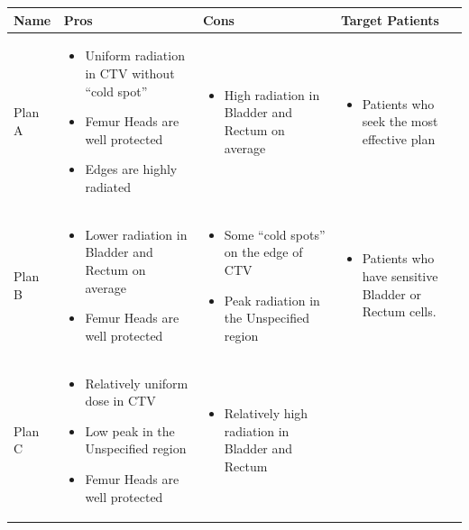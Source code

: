 \documentclass{report}
\begin{document}
\begin{table}[H]
    \centering
     \setlength{\leftmargini}{0.4cm}
    \begin{tabular}{| m{2cm} | m{4cm} | m{4cm} | m{4cm} |}
        \hline
        Name & Pros & Cons & Target Patients \\
        \hline
        Plan A & 
        \begin{itemize} 
            \item Uniform radiation in CTV without ``cold spot''
            \item Femur Heads are well protected
            \item Edges are highly radiated
            
        \end{itemize} & 
        \begin{itemize} 
            \item High radiation in Bladder and Rectum on average 
        \end{itemize} & 
        \begin{itemize} 
            \item Patients who seek the most effective plan

        \end{itemize} \\
        \hline
        Plan B & 
        \begin{itemize} 
            \item Lower radiation in Bladder and Rectum on average
            \item Femur Heads are well protected
        \end{itemize} & 
        \begin{itemize} 
            \item Some ``cold spots'' on the edge of CTV
            \item Peak radiation in the Unspecified region
            
        \end{itemize} & 
        \begin{itemize} 
            \item Patients who have sensitive Bladder or Rectum cells.  
        \end{itemize} \\
        \hline
        
        Plan C & 
        \begin{itemize} 
            \item Relatively uniform dose in CTV
            \item Low peak in the Unspecified region
            \item Femur Heads are well protected
        \end{itemize} & 
        \begin{itemize} 
            \item Relatively high radiation in Bladder and Rectum
            

\end{itemize}
\end{tabular}
\end{table}
\end{document}
